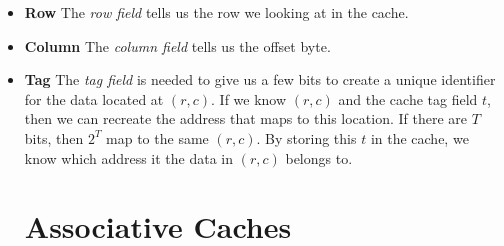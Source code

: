 \begin{itemize}	
\renewcommand{\labelitemi}{$\Box$}
\item \textbf{Row} The \textit{row field} tells us the row we looking at in the cache. 
\item \textbf{Column} The \textit{column field} tells us the offset byte.
\item \textbf{Tag} The \textit{tag field} is needed to give us a few bits to create a unique
identifier for the data located at $(r,c)$. If we know $(r,c)$ and the cache tag field $t$,
then we can recreate the address that maps to this location. If there are $T$ bits, 
then $2^{T}$ map to the same $(r,c)$. By storing this $t$ in the cache, 
we know which address it the data in $(r,c)$ belongs to.




\section{Associative Caches}


\begin{figure}[h]
\end{figure} 




\end{itemize}
